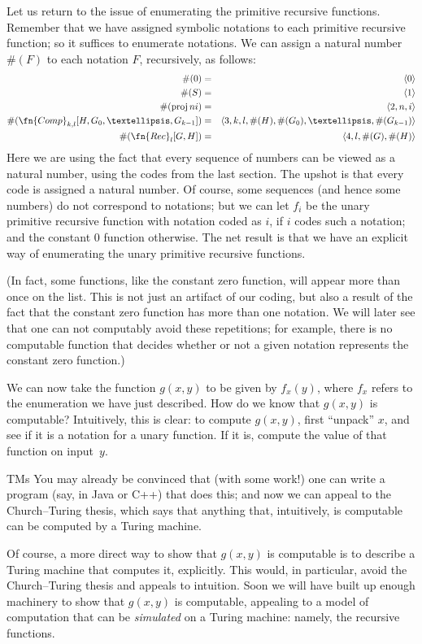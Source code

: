 \documentclass[10pt,a4paper]{article}
\theoremstyle{plain}
\theoremstyle{definition}
\theoremstyle{remark}
\newenvironment{digress}{}{}
\providecommand{\Proj}{\operatorname{proj}}
\begin{document}
Let us return to the issue of enumerating the primitive recursive
functions. Remember that we have assigned symbolic notations to each
primitive recursive function; so it suffices to enumerate
notations. We can assign a natural number $\#(F)$ to each notation $F$,
recursively, as follows:
\begin{eqnarray*}
\#(0) & = & \langle 0 \rangle \\
\#(S) & = & \langle 1 \rangle \\
\#(\Proj{n}{i}) & = & \langle 2, n, i \rangle \\
\#(\fn{Comp}_{k,l}[H,G_0,\dots,G_{k-1}]) & = & \langle
3,k,l,\#(H),\#(G_0),\dots,\#(G_{k-1}) \rangle \\
\#(\fn{Rec}_l[G,H]) & = & \langle 4, l, \#(G), \#(H) \rangle
\end{eqnarray*}
Here we are using the fact that every sequence of numbers can be viewed
as a natural number, using the codes from the last section. The upshot
is that every code is assigned a natural number. Of course, some
sequences (and hence some numbers) do not correspond to notations; but
we can let $f_i$ be the unary primitive recursive function with
notation coded as $i$, if $i$ codes such a notation; and the constant
$0$ function otherwise. The net result is that we have an explicit way of
enumerating the unary primitive recursive functions.

(In fact, some functions, like the constant zero function, will appear
more than once on the list. This is not just an artifact of our
coding, but also a result of the fact that the constant zero function has
more than one notation. We will later see that one can not computably
avoid these repetitions; for example, there is no computable function
that decides whether or not a given notation represents the constant
zero function.)

We can now take the function $g(x,y)$ to be given by $f_x(y)$, where
$f_x$ refers to the enumeration we have just described. How do we know
that $g(x,y)$ is computable? Intuitively, this is clear: to compute
$g(x,y)$, first ``unpack'' $x$, and see if it is a notation for a unary
function. If it is, compute the value of that function on input~$y$.

\begin{tagblock}{TMs}
\begin{digress}
You may already be convinced that (with some work!) one can write a
program (say, in Java or C++) that does this; and now we can appeal to
the Church--Turing thesis, which says that anything that, intuitively,
is computable can be computed by a Turing machine.

Of course, a more direct way to show that $g(x,y)$ is computable is to
describe a Turing machine that computes it, explicitly. This would,
in particular, avoid the Church--Turing thesis and appeals to
intuition. Soon we will have built up enough machinery to show
that $g(x,y)$ is computable, appealing to a model of computation that
can be \emph{simulated} on a Turing machine: namely, the recursive
functions.
\end{digress}
\end{tagblock}
\end{document}
